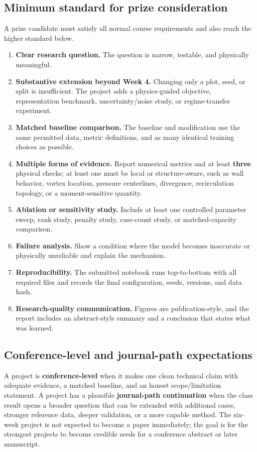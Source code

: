 \documentclass[11pt]{article}
\begin{document}
\subsection{Minimum standard for prize consideration}
A prize candidate must satisfy all normal course requirements and also reach the higher standard below.
\begin{enumerate}
\item \textbf{Clear research question.} The question is narrow, testable, and physically meaningful.
\item \textbf{Substantive extension beyond Week 4.} Changing only a plot, seed, or split is insufficient. The project adds a physics-guided objective, representation benchmark, uncertainty/noise study, or regime-transfer experiment.
\item \textbf{Matched baseline comparison.} The baseline and modification use the same permitted data, metric definitions, and as many identical training choices as possible.
\item \textbf{Multiple forms of evidence.} Report numerical metrics and at least \textbf{three} physical checks; at least one must be local or structure-aware, such as wall behavior, vortex location, pressure centerlines, divergence, recirculation topology, or a moment-sensitive quantity.
\item \textbf{Ablation or sensitivity study.} Include at least one controlled parameter sweep, rank study, penalty study, case-count study, or matched-capacity comparison.
\item \textbf{Failure analysis.} Show a condition where the model becomes inaccurate or physically unreliable and explain the mechanism.
\item \textbf{Reproducibility.} The submitted notebook runs top-to-bottom with all required files and records the final configuration, seeds, versions, and data hash.
\item \textbf{Research-quality communication.} Figures are publication-style, and the report includes an abstract-style summary and a conclusion that states what was learned.
\end{enumerate}

\subsection{Conference-level and journal-path expectations}
A project is \textbf{conference-level} when it makes one clean technical claim with adequate evidence, a matched baseline, and an honest scope/limitation statement. A project has a plausible \textbf{journal-path continuation} when the class result opens a broader question that can be extended with additional cases, stronger reference data, deeper validation, or a more capable method. The six-week project is not expected to become a paper immediately; the goal is for the strongest projects to become credible seeds for a conference abstract or later manuscript.
\end{document}
